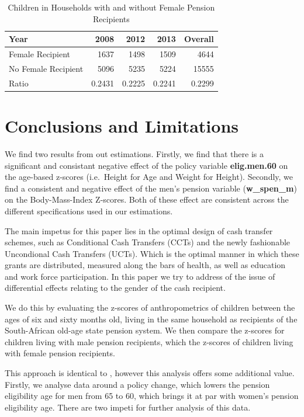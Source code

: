 \begin{refsection}
\begin{table}[ht!]
\centering
\caption{Children in Households with and without Female Pension Recipients}
\label{sa:ta:hfr}
    \begin{tabular}{l|rrrr}
    \hline
    Year                & 2008   & 2012   & 2013   & Overall \\
    \hline
    Female Recipient    & 1637   & 1498   & 1509   & 4644    \\
    No Female Recipient & 5096   & 5235   & 5224   & 15555   \\
    Ratio               & 0.2431 & 0.2225 & 0.2241 & 0.2299  \\
    \end{tabular}
\end{table}


\section{Conclusions and Limitations}
We find two results from out estimations.
Firstly, we find that there is a significant and consistant negative effect of the policy variable \textbf{elig.men.60} on the age-based z-scores
(i.e.~Height for Age and Weight for Height).
Secondly, we find a consistent and negative effect of the men's pension variable (\textbf{w\_spen\_m}) on the Body-Mass-Index Z-scores.
Both of these effect are consistent across the different specifications used in our estimations.

The main impetus for this paper lies in the optimal design of cash transfer schemes,
such as Conditional Cash Transfers (CCTs) and the newly fashionable Uncondional Cash Transfers (UCTs).
Which is the optimal manner in which these grants are distributed, measured along the bars of health,
as well as education and work force participation.
In this paper \parencite[like in][]{duflo2000child,duflo2003grandmothers} we try to address of the issue of differential effects relating to the gender of the cash recipient.

We do this by evaluating the z-scores of anthropometrics of children between the ages of six and sixty months old, living in the same household as recipients of the South-African old-age state pension system. We then compare the z-scores for children living with male pension recipients, which the z-scores of children living with female pension recipients.

This approach is identical to \textcite{duflo2000child,duflo2003grandmothers}, however this analysis offers some additional value.
Firstly, we analyse data around a policy change, which lowers the pension eligibility age for men from 65 to 60,
which brings it at par with women's pension eligibility age.
There are two impeti for further analysis of this data.


\end{refsection}
